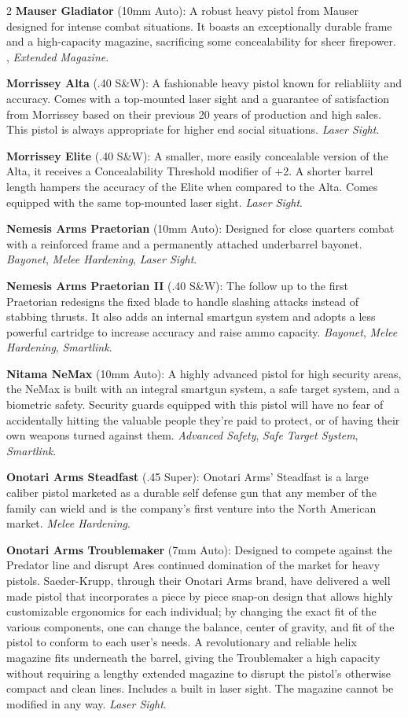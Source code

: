 \documentclass[
  oneside]{article}
\begin{document}
\begin{multicols}{2}
\textbf{Mauser Gladiator} (10mm Auto): A robust
heavy pistol from Mauser designed for intense
combat situations. It boasts an exceptionally
durable frame and a high-capacity magazine,
sacrificing some concealability for sheer
firepower. , \emph{Extended Magazine}.

\textbf{Morrissey Alta} (.40 S\&W): A fashionable
heavy pistol known for reliabliity and accuracy.
Comes with a top-mounted laser sight and a
guarantee of satisfaction from Morrissey based on
their previous 20 years of production and high
sales. This pistol is always appropriate for
higher end social situations. \emph{Laser Sight}.

\textbf{Morrissey Elite} (.40 S\&W): A smaller,
more easily concealable version of the Alta, it
receives a Concealability Threshold modifier of
+2. A shorter barrel length hampers the accuracy
of the Elite when compared to the Alta. Comes
equipped with the same top-mounted laser sight.
\emph{Laser Sight}.

\textbf{Nemesis Arms Praetorian} (10mm Auto):
Designed for close quarters combat with a
reinforced frame and a permanently attached
underbarrel bayonet. \emph{Bayonet}, \emph{Melee
Hardening}, \emph{Laser Sight}.

\textbf{Nemesis Arms Praetorian II} (.40 S\&W):
The follow up to the first Praetorian redesigns
the fixed blade to handle slashing attacks instead
of stabbing thrusts. It also adds an internal
smartgun system and adopts a less powerful
cartridge to increase accuracy and raise ammo
capacity. \emph{Bayonet}, \emph{Melee Hardening},
\emph{Smartlink}.

\textbf{Nitama NeMax} (10mm Auto): A highly
advanced pistol for high security areas, the NeMax
is built with an integral smartgun system, a safe
target system, and a biometric safety. Security
guards equipped with this pistol will have no fear
of accidentally hitting the valuable people
they're paid to protect, or of having their own
weapons turned against them. \emph{Advanced
Safety}, \emph{Safe Target System},
\emph{Smartlink}.

\textbf{Onotari Arms Steadfast} (.45 Super):
Onotari Arms' Steadfast is a large caliber pistol
marketed as a durable self defense gun that any
member of the family can wield and is the
company's first venture into the North American
market. \emph{Melee Hardening}.

\textbf{Onotari Arms Troublemaker} (7mm Auto):
Designed to compete against the Predator line and
disrupt Ares continued domination of the market
for heavy pistols. Saeder-Krupp, through their
Onotari Arms brand, have delivered a well made
pistol that incorporates a piece by piece snap-on
design that allows highly customizable ergonomics
for each individual; by changing the exact fit of
the various components, one can change the
balance, center of gravity, and fit of the pistol
to conform to each user's needs. A revolutionary
and reliable helix magazine fits underneath the
barrel, giving the Troublemaker a high capacity
without requiring a lengthy extended magazine to
disrupt the pistol's otherwise compact and clean
lines. Includes a built in laser sight. The
magazine cannot be modified in any way.
\emph{Laser Sight}.


\end{multicols}
\end{document}
